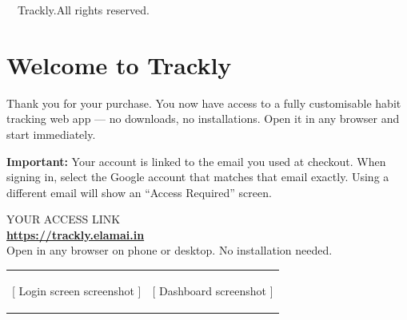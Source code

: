 \documentclass[10pt, a4paper]{article}
\begin{document}
\vspace*{\fill}
\begin{center}
  {\fontsize{7}{9}\selectfont\color{white!20}
    \textcopyright\ \the\year\ Trackly.\enspace All rights reserved.}
\end{center}

\newpage
\restorepagecolor


\section{Welcome to Trackly}

{\fontsize{9.5}{13}\selectfont
Thank you for your purchase. You now have access to a fully customisable habit tracking web app --- no downloads, no installations. Open it in any browser and start immediately.}

\vspace{5pt}

\begin{noticebox}
  \textbf{\textcolor{amber}{Important:}} Your account is linked to the email you used at checkout.
  When signing in, select the Google account that matches that email exactly.
  Using a different email will show an ``Access Required'' screen.
\end{noticebox}

\vspace{5pt}

\begin{darkbox}
  {\fontsize{7}{9}\selectfont\color{white!50} YOUR ACCESS LINK}\\[5pt]
  {\fontsize{13}{16}\selectfont\bfseries\color{white}
    \href{https://trackly.elamai.in}{https://trackly.elamai.in}}\\[4pt]
  {\fontsize{8.5}{11}\selectfont\color{white!50}
    Open in any browser on phone or desktop. No installation needed.}
\end{darkbox}

\vspace{6pt}

\noindent
\begin{tabularx}{\textwidth}{@{}XX@{}}
  \begin{tcolorbox}[
    enhanced, colback=subtle, colframe=border,
    arc=5pt, boxrule=0.5pt, height=38mm,
    valign=center, halign=center,
    fontupper=\fontsize{8}{10}\selectfont\itshape\color{muted},
  ]
    {[} Login screen screenshot {]}
  \end{tcolorbox}
  &
  \begin{tcolorbox}[
    enhanced, colback=subtle, colframe=border,
    arc=5pt, boxrule=0.5pt, height=38mm,
    valign=center, halign=center,
    fontupper=\fontsize{8}{10}\selectfont\itshape\color{muted},
  ]
    {[} Dashboard screenshot {]}
  \end{tcolorbox}
\end{tabularx}
\end{document}
